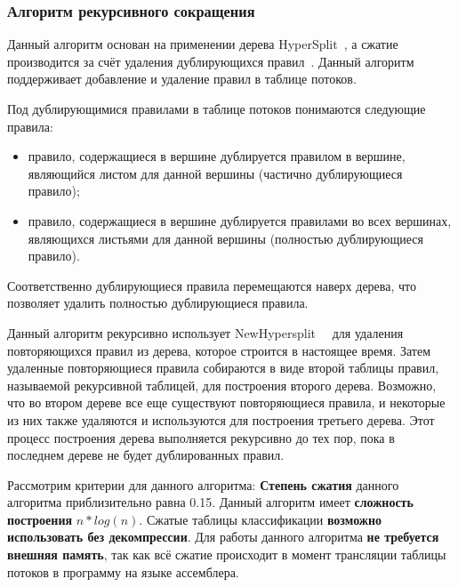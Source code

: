 \documentclass[oneside,final,12pt]{extarticle}
\begin{document}
        \subsubsection{Алгоритм рекурсивного сокращения}
            Данный алгоритм основан на применении дерева HyperSplit~\cite{hypersplit}, а сжатие производится за счёт удаления дублирующихся правил~\cite{chang2019fast}.
            Данный алгоритм поддерживает добавление и удаление правил в таблице потоков.

            Под дублирующимися правилами в таблице потоков понимаются следующие правила:
            \begin{itemize}
                \item правило, содержащиеся в вершине дублируется правилом в вершине, являющийся листом для данной вершины (частично дублирующиеся правило);
                \item правило, содержащиеся в вершине дублируется правилами во всех вершинах, являющихся листьями для данной вершины (полностью дублирующиеся правило).
            \end{itemize}
            Соответственно дублирующиеся правила перемещаются наверх дерева, что позволяет удалить полностью дублирующиеся правила.
            
            Данный алгоритм рекурсивно использует NewHypersplit~\cite{gupta1999packet}~\cite{singh2003packet} для удаления повторяющихся правил из дерева, которое строится в настоящее время. 
            Затем удаленные повторяющиеся правила собираются в виде второй таблицы правил, называемой рекурсивной таблицей, для построения второго дерева. 
            Возможно, что во втором дереве  все еще существуют повторяющиеся правила, и некоторые из них также удаляются и используются для построения третьего дерева. 
            Этот процесс построения дерева выполняется рекурсивно до тех пор, пока в последнем дереве не будет дублированных правил. 

            Рассмотрим критерии для данного алгоритма: \textbf{Степень сжатия} данного алгоритма приблизительно равна 0.15.
            Данный алгоритм имеет \textbf{сложность построения} \(n*log(n)\). Сжатые таблицы классификации \textbf{возможно использовать без декомпрессии}.
            Для работы данного алгоритма \textbf{не требуется внешняя память}, так как всё сжатие происходит в момент трансляции таблицы потоков в
            программу на языке ассемблера.
\end{document}
